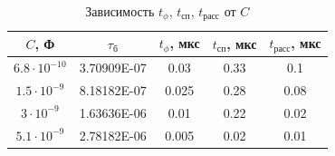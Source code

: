 \begin{table}[H]
	\begin{center}
	\caption{Зависимость $t_\phi$, $t_\text{сп}$, $t_\text{расс}$ от $C$}
		\begin{tabular}{|c|c|c|c|c|}
		\hline 
		$C$, Ф & $\tau_{\text{б}}$ & $t_\phi$, мкс & $t_\text{сп}$, мкс & $t_\text{расс}$, мкс \\ 
		\hline 
		$6.8 \cdot 10^{-10}$ & 3.70909E-07 & 0.03 & 0.33 & 0.1 \\
		\hline
		$1.5 \cdot 10^{-9}$ & 8.18182E-07 & 0.025 & 0.28 & 0.08 \\
		\hline
		$3 \cdot 10^{-9}$ & 1.63636E-06 & 0.01 & 0.22 & 0.02 \\
		\hline		
		$5.1 \cdot 10^{-9}$ & 2.78182E-06 & 0.005 & 0.02 & 0.01 \\
		\hline
		\end{tabular} 
		\label{tab:c}
	\end{center}
\end{table}
\vspace{-1.5cm}
